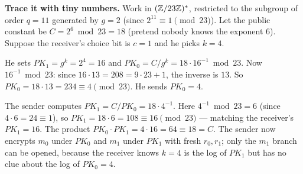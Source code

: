 \begin{labbox}
\textbf{Trace it with tiny numbers.} Work in $(\mathbb{Z}/23\mathbb{Z})^{*}$, restricted to the subgroup of order $q = 11$ generated by $g = 2$ (since $2^{11} \equiv 1 \pmod{23}$). Let the public constant be $C = 2^6 \bmod 23 = 18$ (pretend nobody knows the exponent $6$). Suppose the receiver's choice bit is $c = 1$ and he picks $k = 4$.

He sets $PK_1 = g^k = 2^4 = 16$ and $PK_0 = C / g^k = 18 \cdot 16^{-1} \bmod 23$. Now $16^{-1} \bmod 23$: since $16 \cdot 13 = 208 = 9\cdot 23 + 1$, the inverse is $13$. So $PK_0 = 18 \cdot 13 = 234 \equiv 4 \pmod{23}$. He sends $PK_0 = 4$.

The sender computes $PK_1 = C / PK_0 = 18 \cdot 4^{-1}$. Here $4^{-1} \bmod 23 = 6$ (since $4\cdot 6 = 24 \equiv 1$), so $PK_1 = 18 \cdot 6 = 108 \equiv 16 \pmod{23}$ --- matching the receiver's $PK_1 = 16$. The product $PK_0 \cdot PK_1 = 4 \cdot 16 = 64 \equiv 18 = C$. The sender now encrypts $m_0$ under $PK_0$ and $m_1$ under $PK_1$ with fresh $r_0, r_1$; only the $m_1$ branch can be opened, because the receiver knows $k=4$ is the log of $PK_1$ but has no clue about the log of $PK_0 = 4$.
\end{labbox}

